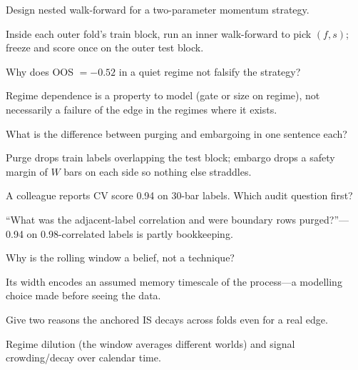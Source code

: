 \begin{exercise}
Design nested walk-forward for a two-parameter momentum strategy.
\end{exercise}
\begin{solution}
Inside each outer fold's train block, run an inner walk-forward to pick $(f,s)$; freeze
and score once on the outer test block.
\end{solution}

\begin{exercise}
Why does OOS $=-0.52$ in a quiet regime not falsify the strategy?
\end{exercise}
\begin{solution}
Regime dependence is a property to model (gate or size on regime), not necessarily a
failure of the edge in the regimes where it exists.
\end{solution}

\begin{exercise}
What is the difference between purging and embargoing in one sentence each?
\end{exercise}
\begin{solution}
Purge drops train labels overlapping the test block; embargo drops a safety margin of
$W$ bars on each side so nothing else straddles.
\end{solution}

\begin{exercise}
A colleague reports CV score 0.94 on 30-bar labels. Which audit question first?
\end{exercise}
\begin{solution}
``What was the adjacent-label correlation and were boundary rows purged?''---0.94 on
0.98-correlated labels is partly bookkeeping.
\end{solution}

\begin{exercise}
Why is the rolling window a belief, not a technique?
\end{exercise}
\begin{solution}
Its width encodes an assumed memory timescale of the process---a modelling choice made
before seeing the data.
\end{solution}

\begin{exercise}
Give two reasons the anchored IS decays across folds even for a real edge.
\end{exercise}
\begin{solution}
Regime dilution (the window averages different worlds) and signal crowding/decay over
calendar time.
\end{solution}

